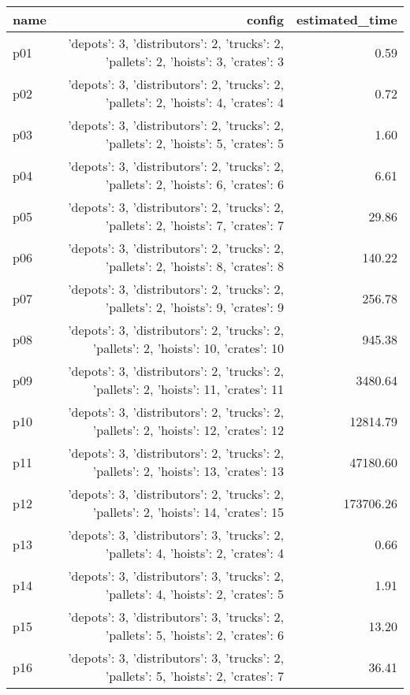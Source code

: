 \documentclass{article}
\begin{document}
                            \begin{center}
                            \scriptsize
                            \begin{tabular}{@{}l|r|r@{}}
                            name & config & estimated\_time\\\midrule
                              p01&{'depots': 3, 'distributors': 2, 'trucks': 2, 'pallets': 2, 'hoists': 3, 'crates': 3}&0.59\\
  p02&{'depots': 3, 'distributors': 2, 'trucks': 2, 'pallets': 2, 'hoists': 4, 'crates': 4}&0.72\\
  p03&{'depots': 3, 'distributors': 2, 'trucks': 2, 'pallets': 2, 'hoists': 5, 'crates': 5}&1.60\\
  p04&{'depots': 3, 'distributors': 2, 'trucks': 2, 'pallets': 2, 'hoists': 6, 'crates': 6}&6.61\\
  p05&{'depots': 3, 'distributors': 2, 'trucks': 2, 'pallets': 2, 'hoists': 7, 'crates': 7}&29.86\\
  p06&{'depots': 3, 'distributors': 2, 'trucks': 2, 'pallets': 2, 'hoists': 8, 'crates': 8}&140.22\\
  p07&{'depots': 3, 'distributors': 2, 'trucks': 2, 'pallets': 2, 'hoists': 9, 'crates': 9}&256.78\\
  p08&{'depots': 3, 'distributors': 2, 'trucks': 2, 'pallets': 2, 'hoists': 10, 'crates': 10}&945.38\\
  p09&{'depots': 3, 'distributors': 2, 'trucks': 2, 'pallets': 2, 'hoists': 11, 'crates': 11}&3480.64\\
  p10&{'depots': 3, 'distributors': 2, 'trucks': 2, 'pallets': 2, 'hoists': 12, 'crates': 12}&12814.79\\
  p11&{'depots': 3, 'distributors': 2, 'trucks': 2, 'pallets': 2, 'hoists': 13, 'crates': 13}&47180.60\\
  p12&{'depots': 3, 'distributors': 2, 'trucks': 2, 'pallets': 2, 'hoists': 14, 'crates': 15}&173706.26\\
  p13&{'depots': 3, 'distributors': 3, 'trucks': 2, 'pallets': 4, 'hoists': 2, 'crates': 4}&0.66\\
  p14&{'depots': 3, 'distributors': 3, 'trucks': 2, 'pallets': 4, 'hoists': 2, 'crates': 5}&1.91\\
  p15&{'depots': 3, 'distributors': 3, 'trucks': 2, 'pallets': 5, 'hoists': 2, 'crates': 6}&13.20\\
  p16&{'depots': 3, 'distributors': 3, 'trucks': 2, 'pallets': 5, 'hoists': 2, 'crates': 7}&36.41\\

\end{tabular}
\end{center}
\end{document}
